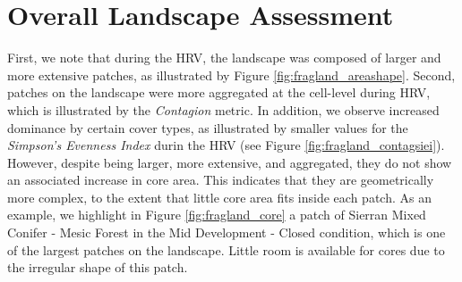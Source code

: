 \section{Overall Landscape Assessment}

First, we note that during the HRV, the landscape was composed of larger and more extensive patches, as illustrated by Figure \ref{fig:fragland_areashape}. 
Second, patches on the landscape were more aggregated at the cell-level during HRV, which is illustrated by the \emph{Contagion} metric. In addition, we observe increased dominance by certain cover types, as illustrated by smaller values for the \emph{Simpson's Evenness Index} durin the HRV (see Figure \ref{fig:fragland_contagsiei}). However, despite being larger, more extensive, and aggregated, they do not show an associated increase in core area. This indicates that they are geometrically more complex, to the extent that little core area fits inside each patch. As an example, we highlight in Figure \ref{fig:fragland_core} a patch of Sierran Mixed Conifer - Mesic Forest in the Mid Development - Closed condition, which is one of the largest patches on the landscape. Little room is available for cores due to the irregular shape of this patch.
